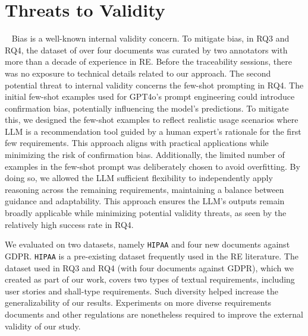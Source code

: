 \section{{Threats to Validity}}~\label{sec:threats}
 Bias is a well-known internal validity concern. To mitigate bias, in RQ3 and RQ4, the dataset of over four documents was curated by two annotators with more than a decade of experience in RE.  Before the traceability sessions, there was no exposure to technical details related to our approach. The second potential threat to internal validity concerns the few-shot prompting in RQ4. The initial few-shot examples used for GPT4o’s prompt engineering could introduce confirmation bias, potentially influencing the model’s predictions. To mitigate this, we designed the few-shot examples to reflect realistic usage scenarios where LLM is a recommendation tool guided by a human expert’s rationale for the first few requirements. This approach aligns with practical applications while minimizing the risk of confirmation bias. Additionally, the limited number of examples in the few-shot prompt was deliberately chosen to avoid overfitting. By doing so, we allowed the LLM sufficient flexibility to independently apply reasoning across the remaining requirements, maintaining a balance between guidance and adaptability. This approach ensures the LLM's outputs remain broadly applicable while minimizing potential validity threats, as seen by the relatively high success rate in RQ4.

 We evaluated \kashif on two datasets, namely \texttt{HIPAA} and four new documents against GDPR. \texttt{HIPAA} is a pre-existing dataset frequently used in the RE literature. The dataset used in RQ3 and RQ4 (with four documents against GDPR), which we created as part of our work, covers two types of textual requirements, including user stories and shall-type requirements. Such diversity helped increase the generalizability of our results. Experiments on more diverse requirements documents and other regulations are nonetheless required to improve the external validity of our study.   


